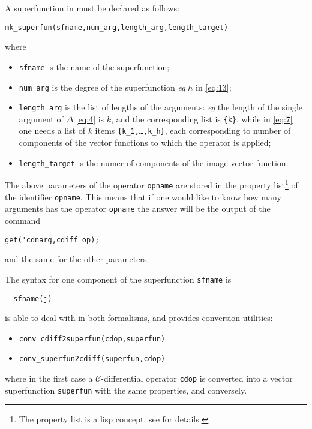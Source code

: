 A superfunction in \cde must be declared as follows:
\begin{verbatim}
mk_superfun(sfname,num_arg,length_arg,length_target)
\end{verbatim}
where
\begin{itemize}
\item \texttt{sfname} is the name of the superfunction;
\item \texttt{num\_arg} is the degree of the superfunction \emph{eg} $h$ in
  \eqref{eq:13};
\item \texttt{length\_arg} is the list of lengths of the arguments: \emph{eg}
  the length of the single argument of $\Delta$ \eqref{eq:4} is $k$, and the
  corresponding list is \texttt{\{k\}}, while in \eqref{eq:7} one needs a list
  of $k$ items \texttt{\{k\_1,\dots,k\_h\}}, each corresponding to number of
  components of the vector functions to which the operator is applied;
\item \texttt{length\_target} is the numer of components of the image vector
  function.
\end{itemize}
The above parameters of the operator \texttt{opname} are stored in the property
list\footnote{The property list is a lisp concept, see \cite{NormanVitolo:InsideReduce} for
  details.} of the identifier \texttt{opname}. This means that if one would
like to know how many arguments has the operator \texttt{opname} the answer
will be the output of the command
\begin{verbatim}
get('cdnarg,cdiff_op);
\end{verbatim}
and the same for the other parameters.

The syntax for one component of the superfunction \texttt{sfname} is
\begin{verbatim}
  sfname(j)
\end{verbatim}

\cde is able to deal with \cdiffops in both formalisms, and provides
conversion utilities:
\begin{itemize}
\item \texttt{conv\_cdiff2superfun(cdop,superfun)}
\item \texttt{conv\_superfun2cdiff(superfun,cdop)}
\end{itemize}
where in the first case a $\mathcal{C}$-differential operator \texttt{cdop} is
converted into a vector superfunction \texttt{superfun} with the same
properties, and conversely.

